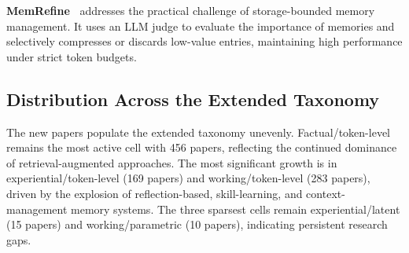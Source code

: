 \textbf{MemRefine~\cite{Kim2026MemRefine}} addresses the practical challenge of storage-bounded memory management. It uses an LLM judge to evaluate the importance of memories and selectively compresses or discards low-value entries, maintaining high performance under strict token budgets.

\subsection{Distribution Across the Extended Taxonomy}

The new papers populate the extended taxonomy unevenly. Factual/token-level remains the most active cell with 456 papers, reflecting the continued dominance of retrieval-augmented approaches. The most significant growth is in experiential/token-level (169 papers) and working/token-level (283 papers), driven by the explosion of reflection-based, skill-learning, and context-management memory systems. The three sparsest cells remain experiential/latent (15 papers) and working/parametric (10 papers), indicating persistent research gaps.

